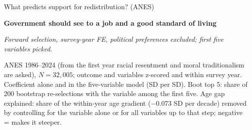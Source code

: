 \documentclass[aspectratio=169]{beamer}
\begin{document}










\begin{frame}{What predicts support for redistribution? (ANES)}

\begin{center}
{\footnotesize\textbf{Government should see to a job and a good standard of living}\par}
{\scriptsize\itshape Forward selection, survey-year FE, political preferences excluded; first five variables picked.\par}
\vspace{0.1em}
{\scriptsize\setlength{\tabcolsep}{4pt}\renewcommand{\arraystretch}{0.82}
}
\end{center}
\vspace{-0.5em}
{\tiny\centering ANES 1986--2024 (from the first year racial resentment and moral traditionalism are asked), $N = 32{,}005$; outcome and variables z-scored and within survey year. Coefficient alone and in the five-variable model (SD per SD). Boot top 5: share of 200 bootstrap re-selections with the variable among the first five. Age gap explained: share of the within-year age gradient ($-0.073$ SD per decade) removed by controlling for the variable alone or for all variables up to that step; negative = makes it steeper.\par}

\end{frame}
\end{document}
